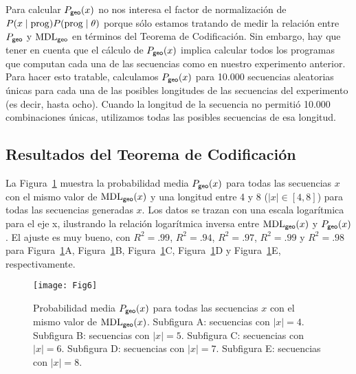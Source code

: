 Para calcular $P_{{\sf geo}}(x)$ no nos interesa el factor de normalización de $P(x \mid {\rm prog}) P({\rm prog} \mid \theta)$ porque sólo estamos tratando de medir la relación entre $P_{{\sf geo}}$ y ${\rm MDL}_{{\sf geo}}$ en términos del Teorema de Codificación. Sin embargo, hay que tener en cuenta que el cálculo de $P_{{\sf geo}}(x)$ implica calcular todos los programas que computan cada una de las secuencias como en nuestro experimento anterior. Para hacer esto tratable, calculamos $P_{{\sf geo}}(x)$ para 10.000 secuencias aleatorias únicas para cada una de las posibles longitudes de las secuencias del experimento (es decir, hasta ocho). Cuando la longitud de la secuencia no permitió 10.000 combinaciones únicas, utilizamos todas las posibles secuencias de esa longitud.

\subsection{Resultados del Teorema de Codificación}


La Figura~\ref{fig:codR} muestra la probabilidad media $P_{{\sf geo}}(x)$ para todas las secuencias $x$ con el mismo valor de ${\rm MDL}_{{\sf geo}}(x)$ y una longitud entre 4 y 8 ($|x| \in \left[4,8 \right]$) para todas las secuencias generadas $x$. Los datos se trazan con una escala logarítmica para el eje x, ilustrando la relación logarítmica inversa entre ${\rm MDL}_{{\sf geo}}(x)$ y $P_{{\sf geo}}(x)$. El ajuste es muy bueno, con $R^2=.99$, $R^2=.94$, $R^2=.97$, $R^2=.99$ y $R^2=.98$ para Figura~\ref{fig:codR}A, Figura~\ref{fig:codR}B, Figura~\ref{fig:codR}C, Figura~\ref{fig:codR}D y Figura~\ref{fig:codR}E, respectivamente.

\begin{figure}[!ht]
    \centering
    \texttt{[image: Fig6]}
    \caption{Probabilidad media $P_{{\sf geo}}(x)$ para todas las secuencias $x$ con el mismo valor de ${\rm MDL}_{{\sf geo}}(x)$.
    Subfigura A: secuencias con $|x| = 4$.
    Subfigura B: secuencias con $|x| = 5$.
    Subfigura C: secuencias con $|x| = 6$.
    Subfigura D: secuencias con $|x| = 7$.
    Subfigura E: secuencias con $|x| = 8$.}
    \label{fig:codR}
\end{figure}


